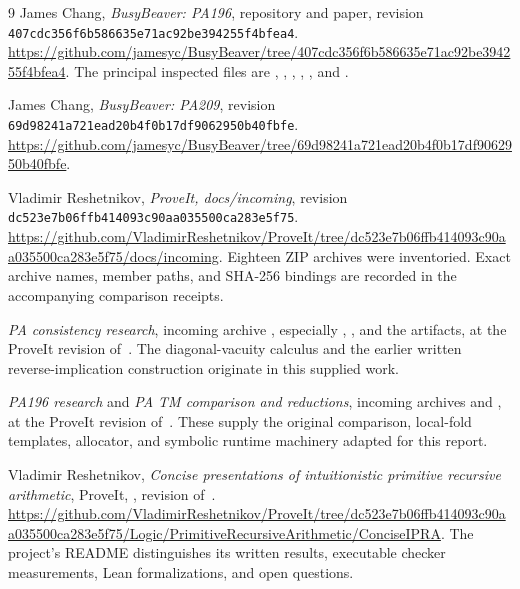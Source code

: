 \begin{thebibliography}{9}
James Chang, \emph{BusyBeaver: PA196}, repository and paper, revision
\nolinkurl{407cdc356f6b586635e71ac92be394255f4bfea4}.
\url{https://github.com/jamesyc/BusyBeaver/tree/407cdc356f6b586635e71ac92be394255f4bfea4}.
The principal inspected files are , , , , , and .

James Chang, \emph{BusyBeaver: PA209}, revision
\nolinkurl{69d98241a721ead20b4f0b17df9062950b40fbfe}.
\url{https://github.com/jamesyc/BusyBeaver/tree/69d98241a721ead20b4f0b17df9062950b40fbfe}.

Vladimir Reshetnikov, \emph{ProveIt, docs/incoming}, revision
\nolinkurl{dc523e7b06ffb414093c90aa035500ca283e5f75}.
\url{https://github.com/VladimirReshetnikov/ProveIt/tree/dc523e7b06ffb414093c90aa035500ca283e5f75/docs/incoming}.
Eighteen ZIP archives were inventoried. Exact archive names, member paths, and SHA-256 bindings are recorded in the accompanying comparison receipts.

\emph{PA consistency research}, incoming archive
, especially , , and the  artifacts, at the ProveIt revision of~\cite{incoming}. The diagonal-vacuity calculus and the earlier written reverse-implication construction originate in this supplied work.

\emph{PA196 research} and \emph{PA TM comparison and reductions}, incoming archives
 and , at the ProveIt revision of~\cite{incoming}. These supply the original comparison, local-fold templates, allocator, and symbolic runtime machinery adapted for this report.

Vladimir Reshetnikov, \emph{Concise presentations of intuitionistic primitive recursive arithmetic}, ProveIt, , revision of~\cite{incoming}.
\url{https://github.com/VladimirReshetnikov/ProveIt/tree/dc523e7b06ffb414093c90aa035500ca283e5f75/Logic/PrimitiveRecursiveArithmetic/ConciseIPRA}.
The project's README distinguishes its written results, executable checker measurements, Lean formalizations, and open questions.
\end{thebibliography}
